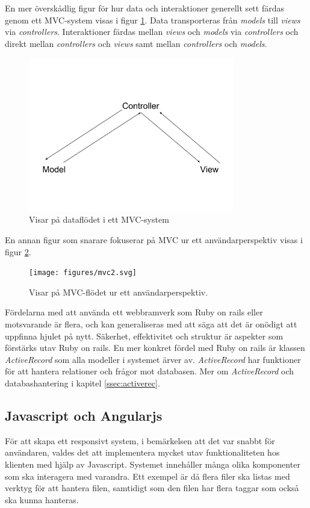 \documentclass[a4paper,12pt,oneside,final]{extbook}
\begin{document}
En mer överskådlig figur för hur data och interaktioner generellt sett färdas genom ett MVC-system visas i figur \ref{fig:mvc1}. Data transporteras från \textit{models} till \textit{views} via \textit{controllers}. Interaktioner färdas mellan \textit{views} och \textit{models} via \textit{controllers} och direkt mellan \textit{controllers} och \textit{views} samt mellan \textit{controllers} och \textit{models}.

\begin{figure}[!H]
\centering
\includegraphics[width=0.8\textwidth]{figures/mvc1.png}
\caption{Visar på dataflödet i ett MVC-system}
\label{fig:mvc1}
\end{figure}

En annan figur som snarare fokuserar på MVC ur ett användarperspektiv visas i figur \ref{fig:mvc2}.

\begin{figure}[!H]
\centering
\texttt{[image: figures/mvc2.svg]}
\caption{Visar på MVC-flödet ur ett användarperspektiv.}
\label{fig:mvc2}
\end{figure}

Fördelarna med att använda ett webbramverk som Ruby on rails eller motsvarande är flera, och kan generaliseras med att säga att det är onödigt att uppfinna hjulet på nytt. Säkerhet, effektivitet och struktur är aspekter som förstärks utav Ruby on rails. En mer konkret fördel med Ruby on rails är klassen \emph{ActiveRecord} som alla modeller i systemet ärver av. \emph{ActiveRecord} har funktioner för att hantera relationer och frågor mot databasen. Mer om \emph{ActiveRecord} och databashantering i kapitel \ref{ssec:activerec}.

\subsection{Javascript och Angularjs}
För att skapa ett responsivt system, i bemärkelsen att det var snabbt för användaren, valdes det att implementera mycket utav funktionaliteten hos klienten med hjälp av Javascript. Systemet innehåller många olika komponenter som ska interagera med varandra. Ett exempel är då flera filer ska listas med verktyg för att hantera filen, samtidigt som den filen har flera taggar som också ska kunna hanteras. 
\end{document}
